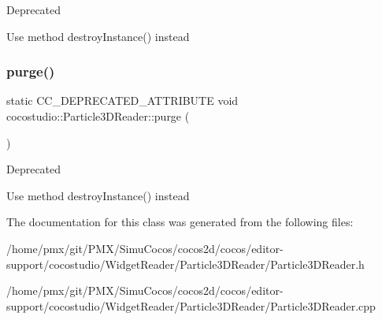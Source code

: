 \begin{DoxyRefDesc}{Deprecated}
\item[\hyperlink{deprecated__deprecated000097}{Deprecated}]Use method destroy\+Instance() instead \end{DoxyRefDesc}
\mbox{\label{classcocostudio_1_1Particle3DReader_a054ae03e43d93eb07de4f1e1f6950e1c}} 
\subsubsection{\texorpdfstring{purge()}{purge()}\hspace{0.1cm}{\footnotesize\ttfamily [2/2]}}
{\footnotesize\ttfamily static C\+C\+\_\+\+D\+E\+P\+R\+E\+C\+A\+T\+E\+D\+\_\+\+A\+T\+T\+R\+I\+B\+U\+TE void cocostudio\+::\+Particle3\+D\+Reader\+::purge (\begin{DoxyParamCaption}{ }\end{DoxyParamCaption})\hspace{0.3cm}{\ttfamily [static]}}

\begin{DoxyRefDesc}{Deprecated}
\item[\hyperlink{deprecated__deprecated000332}{Deprecated}]Use method destroy\+Instance() instead \end{DoxyRefDesc}


The documentation for this class was generated from the following files\+:\begin{DoxyCompactItemize}
\item 
/home/pmx/git/\+P\+M\+X/\+Simu\+Cocos/cocos2d/cocos/editor-\/support/cocostudio/\+Widget\+Reader/\+Particle3\+D\+Reader/Particle3\+D\+Reader.\+h\item 
/home/pmx/git/\+P\+M\+X/\+Simu\+Cocos/cocos2d/cocos/editor-\/support/cocostudio/\+Widget\+Reader/\+Particle3\+D\+Reader/Particle3\+D\+Reader.\+cpp\end{DoxyCompactItemize}
